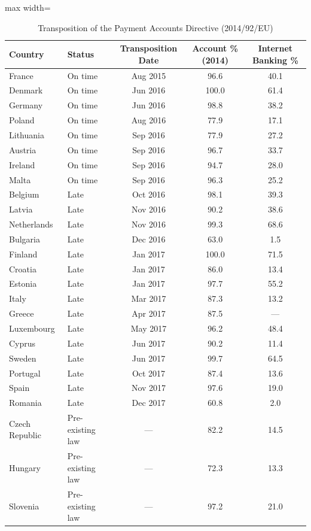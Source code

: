 \begin{table}[htbp]
\centering
\caption{Transposition of the Payment Accounts Directive (2014/92/EU)}
\label{tab:transposition}
\begin{adjustbox}{max width=\textwidth}
\begin{tabular}{llccc}
\hline\hline
Country & Status & Transposition Date & Account \% (2014) & Internet Banking \% \\
\hline
France & On time & Aug 2015 & 96.6 & 40.1 \\
Denmark & On time & Jun 2016 & 100.0 & 61.4 \\
Germany & On time & Jun 2016 & 98.8 & 38.2 \\
Poland & On time & Aug 2016 & 77.9 & 17.1 \\
Lithuania & On time & Sep 2016 & 77.9 & 27.2 \\
Austria & On time & Sep 2016 & 96.7 & 33.7 \\
Ireland & On time & Sep 2016 & 94.7 & 28.0 \\
Malta & On time & Sep 2016 & 96.3 & 25.2 \\
Belgium & Late & Oct 2016 & 98.1 & 39.3 \\
Latvia & Late & Nov 2016 & 90.2 & 38.6 \\
Netherlands & Late & Nov 2016 & 99.3 & 68.6 \\
Bulgaria & Late & Dec 2016 & 63.0 & 1.5 \\
Finland & Late & Jan 2017 & 100.0 & 71.5 \\
Croatia & Late & Jan 2017 & 86.0 & 13.4 \\
Estonia & Late & Jan 2017 & 97.7 & 55.2 \\
Italy & Late & Mar 2017 & 87.3 & 13.2 \\
Greece & Late & Apr 2017 & 87.5 & --- \\
Luxembourg & Late & May 2017 & 96.2 & 48.4 \\
Cyprus & Late & Jun 2017 & 90.2 & 11.4 \\
Sweden & Late & Jun 2017 & 99.7 & 64.5 \\
Portugal & Late & Oct 2017 & 87.4 & 13.6 \\
Spain & Late & Nov 2017 & 97.6 & 19.0 \\
Romania & Late & Dec 2017 & 60.8 & 2.0 \\
Czech Republic & Pre-existing law & --- & 82.2 & 14.5 \\
Hungary & Pre-existing law & --- & 72.3 & 13.3 \\
Slovenia & Pre-existing law & --- & 97.2 & 21.0 \\

\end{tabular}
\end{adjustbox}
\end{table}
